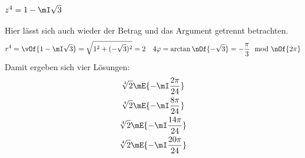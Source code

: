 	\subsection{$z^4 = 1 - \mI \sqrt{3}$}
	Hier lässt sich auch wieder der Betrag und das Argument getrennt betrachten.
	\begin{equation}
		r^4 = \vOf{1-\mI\sqrt{3}} = \sqrt{1^2 + (-\sqrt{3})^2} = 2 \quad 4\varphi = \arctan\nOf{-\sqrt{3}} = -\frac{\pi}{3} \mod\nOf{2\pi}
	\end{equation}
	Damit ergeben sich vier Lösungen:
	\begin{gather}
		\sqrt[4]{2} \mE{-\mI\frac{2\pi}{24}} \\
		\sqrt[4]{2} \mE{-\mI\frac{8\pi}{24}} \\
		\sqrt[4]{2} \mE{-\mI\frac{14\pi}{24}} \\
		\sqrt[4]{2} \mE{-\mI\frac{20\pi}{24}} \\
	\end{gather}
